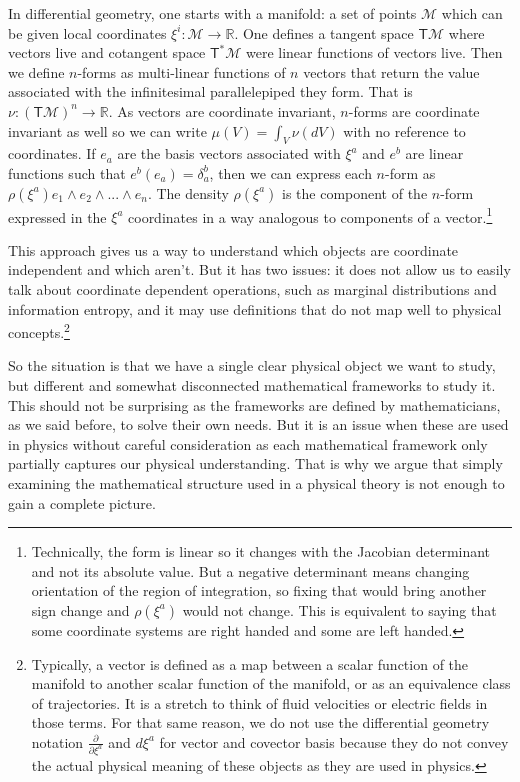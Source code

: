 \documentclass[11pt]{article}
\begin{document}
In differential geometry, one starts with a manifold: a set of points $\mathcal{M}$ which can be given local coordinates $\xi^i : \mathcal{M} \to \mathbb{R}$. One defines a tangent space $\mathsf{T}\mathcal{M}$ where vectors live and cotangent space $\mathsf{T}^*\mathcal{M}$ were linear functions of vectors live. Then we define $n$-forms as multi-linear functions of $n$ vectors that return the value associated with the infinitesimal parallelepiped they form. That is $\nu : (\mathsf{T}\mathcal{M})^n \rightarrow \mathbb{R}$. As vectors are coordinate invariant, $n$-forms are coordinate invariant as well so we can write $\mu(V)=\int_V \nu(dV)$ with no reference to coordinates. If $e_a$ are the basis vectors associated with $\xi^a$ and $e^b$ are linear functions such that $e^b(e_a)=\delta_a^b$, then we can express each $n$-form as $\rho(\xi^a)e_1\wedge e_2 \wedge ... \wedge e_n$. The density $\rho(\xi^a)$ is the component of the $n$-form expressed in the $\xi^a$ coordinates in a way analogous to components of a vector.\footnote{Technically, the form is linear so it changes with the Jacobian determinant and not its absolute value. But a negative determinant means changing orientation of the region of integration, so fixing that would bring another sign change and $\rho(\xi^a)$ would not change. This is equivalent to saying that some coordinate systems are right handed and some are left handed.}

This approach gives us a way to understand which objects are coordinate independent and which aren't. But it has two issues: it does not allow us to easily talk about coordinate dependent operations, such as marginal distributions and information entropy, and it may use definitions that do not map well to physical concepts.\footnote{Typically, a vector is defined as a map between a scalar function of the manifold to another scalar function of the manifold, or as an equivalence class of trajectories. It is a stretch to think of fluid velocities or electric fields in those terms. For that same reason, we do not use the differential geometry notation $\frac{\partial}{\partial \xi^a}$ and $d\xi^a$ for vector and covector basis because they do not convey the actual physical meaning of these objects as they are used in physics.}

So the situation is that we have a single clear physical object we want to study, but different and somewhat disconnected mathematical frameworks to study it. This should not be surprising as the frameworks are defined by mathematicians, as we said before, to solve their own needs. But it is an issue when these are used in physics without careful consideration as each mathematical framework only partially captures our physical understanding. That is why we argue that simply examining the mathematical structure used in a physical theory is not enough to gain a complete picture.
\end{document}
